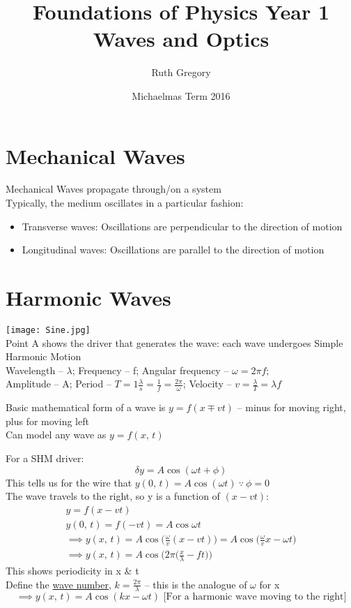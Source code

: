\documentclass[a4paper, 11pt, fleqn, normalem]{report}
\title{Foundations of Physics Year 1 \\ Waves and Optics \vspace{-20pt}}
\author{Ruth Gregory}
\date{\vspace{-15pt}Michaelmas Term 2016}
\begin{document}
\maketitle
\thispagestyle{fancy}

\tableofcontents

\newpage
\section{Mechanical Waves}
Mechanical Waves propagate through/on a system \\
Typically, the medium oscillates in a particular fashion:
\begin{itemize}
    \item Transverse waves: Oscillations are perpendicular to the direction of motion
    \item Longitudinal waves: Oscillations are parallel to the direction of motion
\end{itemize}

\section{Harmonic Waves}
\texttt{[image: Sine.jpg]} \\
Point A shows the driver that generates the wave: each wave undergoes Simple Harmonic Motion \\
Wavelength -- $\lambda$; Frequency -- f; Angular frequency -- $\omega = 2{\pi}f$; \\
Amplitude -- A; Period -- $T = 1 \frac{\lambda}{s} = \frac{1}{f} = \frac{2\pi}{\omega}$; Velocity -- $v = \frac{\lambda}{T} = {\lambda}f$

Basic mathematical form of a wave is $y = f(x \mp vt)$ -- minus for moving right, plus for moving left \\
Can model any wave as $y = f(x,\,t)$

For a SHM driver:
\begin{equation*}
    {\delta}y = A\cos{({\omega}t + \phi)}
\end{equation*}
This tells us for the wire that $y(0,\,t) = A\cos{({\omega}t)} ~\because~ \phi = 0$ \\
The wave travels to the right, so y is a function of $(x-vt)$:
\begin{gather*}
    y = f(x-vt) \\
    y(0,\,t) = f(-vt) = A\cos{{\omega}t} \\
    \implies y(x,\,t) = A\cos{\Big(\frac{\omega}{v}(x-vt)\Big)} = A\cos{\Big(\frac{\omega}{v}x - {\omega}t\Big)} \\
    \implies y(x,\,t) = A\cos{\Big(2\pi\Big(\frac{x}{\lambda} - ft\Big)\Big)}
\end{gather*}
This shows periodicity in x \& t \\
Define the \underline{wave number}, $k = \frac{2\pi}{\lambda}$ -- this is the analogue of $\omega$ for x
\begin{equation*}
    \implies y(x,\,t) = A\cos{(kx - {\omega}t)} \text{ [For a harmonic wave moving to the right]}
\end{equation*}
\end{document}
